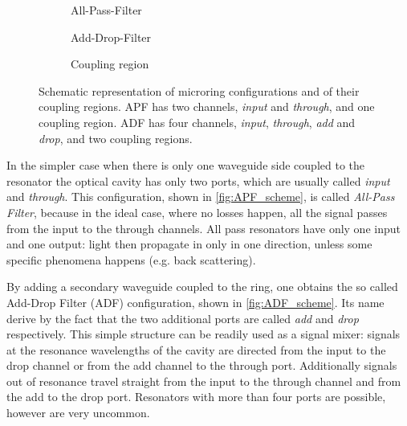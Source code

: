 
\begin{figure}[ht]
	\centering
	\begin{subfigure}[b]{0.3\textwidth}
		\centering
		
		\caption{All-Pass-Filter}
		\label{fig:APF_scheme}
	\end{subfigure}
	\hspace{.02\textwidth}
	\begin{subfigure}[b]{0.3\textwidth}
		\centering
		
		\caption{Add-Drop-Filter}
		\label{fig:ADF_scheme}
	\end{subfigure}
	\hspace{.02\textwidth}
	\begin{subfigure}[b]{0.3\textwidth}
		\centering
		
		\caption{Coupling region}
		\label{fig:coupling_scheme}
	\end{subfigure}
	
	\caption{
		Schematic representation of microring configurations and of their coupling regions.
		APF has two channels, \textit{input} and \textit{through}, and one coupling region.
		ADF has four channels, \textit{input}, \textit{through}, \textit{add} and \textit{drop}, and two coupling regions.
	}
	\label{fig:resonator_theory}
\end{figure}

In the simpler case when there is only one waveguide side coupled to the resonator the optical cavity has only two ports, which are usually called \textit{input} and \textit{through}.
This configuration, shown in \autoref{fig:APF_scheme}, is called \textit{All-Pass Filter}, because in the ideal case, where no losses happen, all the signal passes from the input to the through channels.
All pass resonators have only one input and one output: light then propagate in only in one direction, unless some specific phenomena happens (e.g. back scattering).

By adding a secondary waveguide coupled to the ring, one obtains the so called Add-Drop Filter (ADF) configuration, shown in \autoref{fig:ADF_scheme}.
Its name derive by the fact that the two additional ports are called \textit{add} and \textit{drop} respectively.
This simple structure can be readily used as a signal mixer: signals at the resonance wavelengths of the cavity are directed from the input to the drop channel or from the add channel to the through port.
Additionally signals out of resonance travel straight from the input to the through channel and from the add to the drop port.
Resonators with more than four ports are possible, however are very uncommon.

